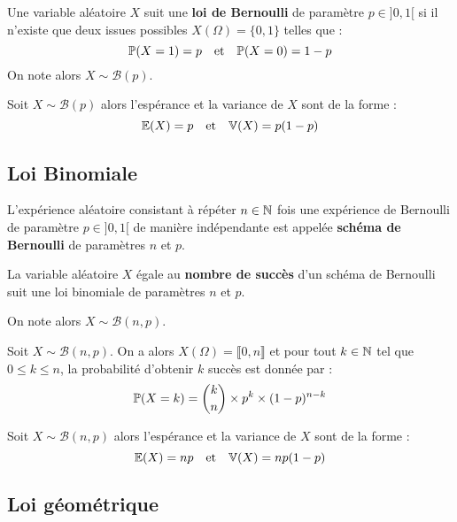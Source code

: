 \begin{definition}
    Une variable aléatoire $X$ suit une \textbf{loi de Bernoulli} de paramètre $p \in ]0,1[$ si il n'existe que deux issues 
    possibles $X(\Omega) = \{ 0,1 \}$ telles que : 
        \[ \mathbb{P}(X = 1) = p \quad \text{et} \quad \mathbb{P}(X = 0) = 1 - p \] 
    On note alors $X \sim \mathcal{B}(p)$.  
\end{definition}

\begin{proposition}
    Soit $X \sim \mathcal{B}(p)$ alors l'espérance et la variance de $X$ sont de la forme :
        \[ \mathbb{E}(X) = p \quad \text{et} \quad \mathbb{V}(X) = p(1-p)  \] 
\end{proposition}

\subsection{Loi Binomiale}

L'expérience aléatoire consistant à répéter $n \in \mathbb{N}$ fois une expérience de Bernoulli de paramètre $ p \in ]0,1[$
de {manière indépendante} est appelée \textbf{schéma de Bernoulli} de paramètres $n$ et $p$. 

\begin{definition}
    La variable aléatoire $X$ égale au \textbf{nombre de succès} d'un schéma de Bernoulli suit une {loi binomiale} 
    de paramètres $n$ et $p$. 

    On note alors $X \sim \mathcal{B}(n,p)$. 
\end{definition}

\begin{proposition}
    Soit $X \sim \mathcal{B}(n,p)$. On a alors $X(\Omega) = \llbracket 0, n \rrbracket$ et pour tout $k \in \mathbb{N}$ tel que 
    $0 \leqslant k \leqslant n $, {la probabilité d'obtenir $k$ succès} est donnée par :
        \[ \mathbb{P}(X = k) = \binom{k}{n} \times p^k \times (1-p)^{n-k}  \] 
\end{proposition}

\begin{proposition}
    Soit $X \sim \mathcal{B}(n,p)$ alors l'espérance et la variance de $X$ sont de la forme :
        \[ \mathbb{E}(X) = np \quad \text{et} \quad \mathbb{V}(X) = np(1-p)  \] 
\end{proposition}

\newpage
\subsection{Loi géométrique}

